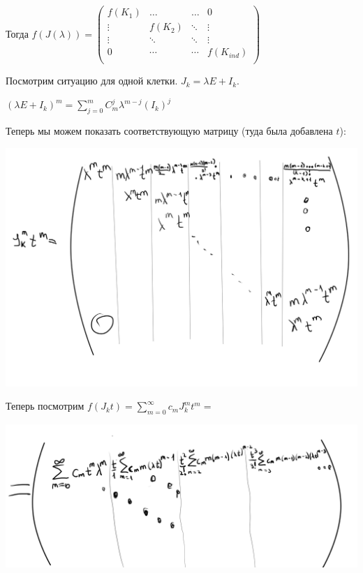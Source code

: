 Тогда $f(J(\lambda)) = \begin{pmatrix}
   f(K_1) & \ldots & \ldots & 0 \\
    \vdots & f(K_2) & \ddots & \vdots\\
    \vdots & \ddots & \ddots & \vdots\\
    0 & \cdots & \cdots & f(K_{ind})\\
\end{pmatrix}$

Посмотрим ситуацию для одной клетки. $J_k = \lambda E + I_k$.

$(\lambda E + I_k)^m = \sum\limits_{j=0}^m C_m^j \lambda^{m-j} (I_k)^j  $ %

Теперь мы можем показать соответствующую матрицу (туда была добавлена $t$):
\begin{center}
 \includegraphics[width = 15cm]{assets/7_10-function.png}
\end{center}
Теперь посмотрим $f(J_kt)=\sum\limits_{m=0}^{\infty}c_m J_k^mt^m = $
\begin{center}
 \includegraphics[width = 15cm]{assets/7_10-limit-function.png}
\end{center}

